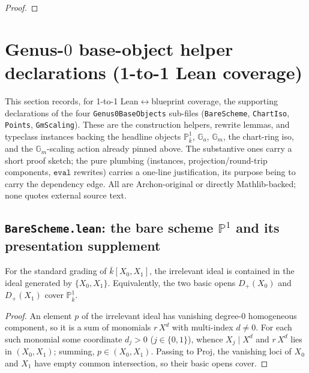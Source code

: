 \begin{proof}
  
\end{proof}
\section{Genus-\(0\) base-object helper declarations (1-to-1 Lean coverage)}
\label{sec:genus0_helpers}
This section records, for 1-to-1 Lean\(\leftrightarrow\)blueprint coverage, the supporting
declarations of the four \texttt{Genus0BaseObjects} sub-files (\texttt{BareScheme},
\texttt{ChartIso}, \texttt{Points}, \texttt{GmScaling}). These are the construction
helpers, rewrite lemmas, and typeclass instances backing the headline objects \(\mathbb
P^1_{\bar k}\), \(\mathbb G_a\), \(\mathbb G_m\), the chart-ring iso, and the \(\mathbb
G_m\)-scaling action already pinned above. The substantive ones carry a short proof
sketch; the pure plumbing (instances, projection/round-trip components, \(\mathtt{eval}\)
rewrites) carries a one-line justification, its purpose being to carry the dependency edge.
All are Archon-original or directly Mathlib-backed; none quotes external source text.

\subsection*{\texttt{BareScheme.lean}: the bare scheme \(\mathbb P^1\) and its presentation supplement}
\begin{lemma}
  \label{lem:projectiveLineBarAffineCover_span}
  For the standard grading of \(\bar k[X_0, X_1]\), the irrelevant ideal is contained in the
  ideal generated by \(\{X_0, X_1\}\). Equivalently, the two basic opens \(D_+(X_0)\) and
  \(D_+(X_1)\) cover \(\mathbb P^1_{\bar k}\).
\end{lemma}
\begin{proof}\leanok
  An element \(p\) of the irrelevant ideal has vanishing degree-\(0\) homogeneous component,
  so it is a sum of monomials \(r\,X^d\) with multi-index \(d \neq 0\). For each such monomial
  some coordinate \(d_j > 0\) (\(j \in \{0,1\}\)), whence \(X_j \mid X^d\) and \(r\,X^d\) lies
  in \((X_0, X_1)\); summing, \(p \in (X_0, X_1)\). Passing to \(\mathrm{Proj}\), the vanishing
  loci of \(X_0\) and \(X_1\) have empty common intersection, so their basic opens cover.
\end{proof}

